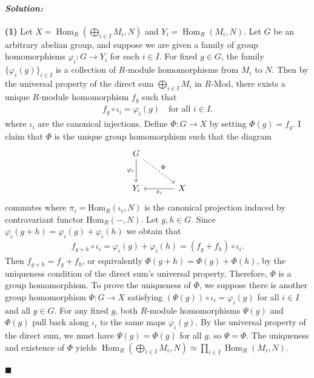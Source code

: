 \documentclass[12pt, a4paper]{article}
\theoremstyle{remark}
\newenvironment{solution}
  {\paragraph{\textit{Solution:}}\par\medskip}
  {\hfill$\blacksquare$\vspace{0.1cm}}
\begin{document}
\begin{solution}
\textbf{(1)}
Let $X = \operatorname{Hom}_R\left(\bigoplus_{i\in I} M_i, N\right)$ and $Y_i = \operatorname{Hom}_R(M_i, N)$. 
Let $G$ be an arbitrary abelian group, and suppose we are given a family of group homomorphisms $\varphi_i: G \to Y_i$ for each $i \in I$. 
For fixed $g\in G$, the family $\{\varphi_i(g)\}_{i \in I}$ is a collection of $R$-module homomorphisms from $M_i$ to $N$.
Then by the universal property of the direct sum $\bigoplus_{i \in I} M_i$ in $R$-Mod, there exists a unique $R$-module homomorphism $f_g$
such that 
\begin{align*}
    f_g \circ \iota_i = \varphi_i(g) \quad \text{for all } i \in I.
\end{align*}
where $\iota_i$ are the canonical injections. Define $\Phi: G \to X$ by setting $\Phi(g) = f_g$. I claim that $\Phi$ is the unique group 
homomorphism such that the diagram
\[
\begin{tikzcd}[ampersand replacement=\&, row sep=large, column sep=large]
    G \arrow[d, "\varphi_i"'] \arrow[dr, "\Phi", dashed] \& \\
    Y_i \& X \arrow[l, "\pi_i"]
\end{tikzcd}
\]
commutes where $\pi_i=\text{Hom}_R(\iota_i,N)$ is the canonical projection induced by contravariant functor $\text{Hom}_R(-,N)$. Let $g, h \in G$. Since $\varphi_i(g+h)= \varphi_i(g)+\varphi_i(h)$ we obtain that
\begin{align*}
    f_{g+h}\circ \iota_i = \varphi_i(g)+\varphi_i(h) = (f_{g}+f_{h})\circ \iota_i.
\end{align*}
Then $f_{g+h} = f_g+f_h$, or equivalently $\Phi(g+h)=\Phi(g)+\Phi(h)$, by the uniqueness condition of the direct sum's universal property.  Therefore, $\Phi$ is a 
group homomorphism. To prove the uniqueness of $\Phi$, we suppose
there is another group homomorphism $\Psi: G \to X$ satisfying $(\Psi(g)) \circ \iota_i = \varphi_i(g)$ for all $i \in I$ and all $g \in G$. For any fixed $g$, both $R$-module homomorphisms $\Psi(g)$ and $\Phi(g)$ pull back along $\iota_i$ to the same maps $\varphi_i(g)$. 
By the universal property of the direct sum, we must have $\Psi(g) = \Phi(g)$ for all $g$, so $\Psi = \Phi$.
The uniqueness and existence of $\Phi$ yields $\operatorname{Hom}_R\left(\bigoplus_{i\in I} M_i, N\right) \simeq \prod_{i\in I} \operatorname{Hom}_R(M_i, N)$.


\end{solution}
\end{document}
